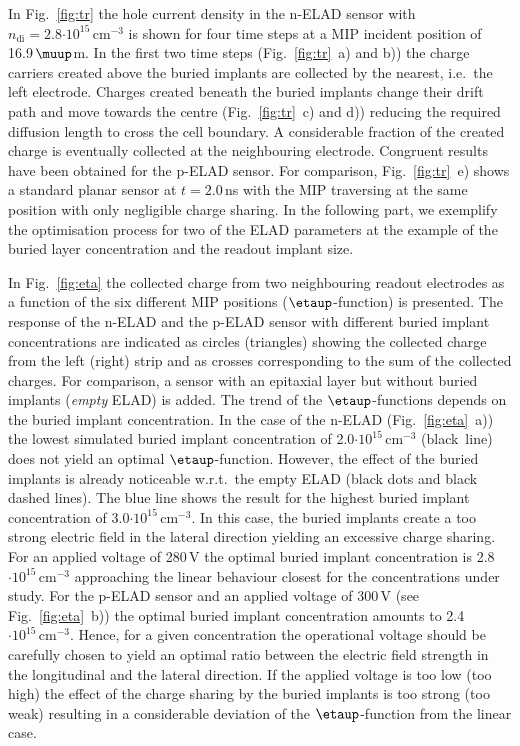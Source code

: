 \documentclass[a4paper,11pt]{article}
\begin{document}
In Fig.~\ref{fig:tr} the hole current density in the n-ELAD sensor with $n\mathrm{_{di}} = 2.8\mathrm{\cdot10^{15}\,cm^{-3}}$ is shown for four time steps at a MIP incident position of 16.9\,$\muup$m.
In the first two time steps (Fig.~\ref{fig:tr}~a) and b)) the charge carriers created above the buried implants are collected by the nearest, i.e.\ the left electrode.
Charges created beneath the buried implants change their drift path and move towards the centre (Fig.~\ref{fig:tr}~c) and d)) reducing the required diffusion length to cross the cell boundary.
A considerable fraction of the created charge is eventually collected at the neighbouring electrode. 
Congruent results have been obtained for the p-ELAD sensor.
For comparison, Fig.~\ref{fig:tr}~e) shows a standard planar sensor at $t = 2.0\,$ns with the MIP traversing at the same position with only negligible charge sharing.
In the following part, we exemplify the optimisation process for two of the ELAD parameters at the example of the buried layer concentration and the readout implant size. 

In Fig.~\ref{fig:eta} the collected charge from two neighbouring readout electrodes as a function of the six different MIP positions ($\etaup$-function) is presented.
The response of the n-ELAD and the p-ELAD sensor with different buried implant concentrations are indicated as
 circles (triangles) showing the collected charge from the left (right) strip
 and as crosses corresponding to the sum of the collected charges. 
For comparison, a sensor with an epitaxial layer but without buried implants (\textit{empty} ELAD) is added. 
The trend of the $\etaup$-functions depends on the buried implant concentration.
In the case of the n-ELAD (Fig.~\ref{fig:eta}~a)) the lowest simulated buried implant concentration of 2.0$\mathrm{\cdot10^{15}\,cm^{-3}}$ (black~line) does not yield an optimal $\etaup$-function.
However, the effect of the buried implants is already noticeable w.r.t.\ the empty ELAD (black dots and black dashed lines). 
The blue line shows the result for the highest buried implant concentration of 3.0$\mathrm{\cdot10^{15}\,cm^{-3}}$. 
In this case, the buried implants create a too strong electric field in the lateral direction yielding an excessive charge sharing.
For an applied voltage of 280\,V the optimal buried implant concentration is 2.8$\mathrm{\cdot10^{15}\,cm^{-3}}$ approaching the linear behaviour closest for the concentrations under study.
For the p-ELAD sensor and an applied voltage of 300\,V (see Fig.~\ref{fig:eta}~b)) the optimal buried implant concentration amounts to 2.4$\mathrm{\cdot10^{15}\,cm^{-3}}$.
Hence, for a given concentration the operational voltage should be carefully chosen to yield an optimal ratio between the electric field strength in the longitudinal and the lateral direction. 
If the applied voltage is too low (too high) the effect of the charge sharing by the buried implants is too strong (too weak) resulting in a considerable deviation of the $\etaup$-function from the linear case.
\end{document}
